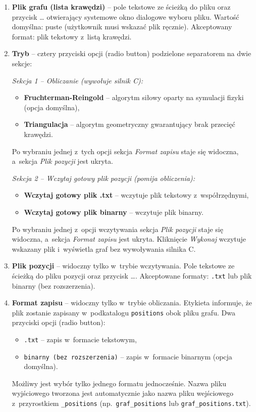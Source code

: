 \documentclass[12pt,a4paper]{article}
\begin{document}
\begin{enumerate}
    \item \textbf{Plik grafu (lista krawędzi)} -- pole tekstowe ze ścieżką do pliku oraz przycisk \ldots{} otwierający systemowe okno dialogowe wyboru pliku. Wartość domyślna: puste (użytkownik musi wskazać plik ręcznie). Akceptowany format: plik tekstowy z~listą krawędzi.

    \item \textbf{Tryb} -- cztery przyciski opcji (radio button) podzielone separatorem na dwie sekcje:
    
    \textit{Sekcja 1 -- Obliczanie (wywołuje silnik C):}
    \begin{itemize}
        \item \textbf{Fruchterman-Reingold} -- algorytm siłowy oparty na symulacji fizyki (opcja domyślna),
        \item \textbf{Triangulacja} -- algorytm geometryczny gwarantujący brak przecięć krawędzi.
    \end{itemize}
    Po wybraniu jednej z~tych opcji sekcja \textit{Format zapisu} staje się widoczna, a~sekcja \textit{Plik pozycji} jest ukryta.

    \textit{Sekcja 2 -- Wczytaj gotowy plik pozycji (pomija obliczenia):}
    \begin{itemize}
        \item \textbf{Wczytaj gotowy plik .txt} -- wczytuje plik tekstowy z~współrzędnymi,
        \item \textbf{Wczytaj gotowy plik binarny} -- wczytuje plik binarny.
    \end{itemize}
    Po wybraniu jednej z~opcji wczytywania sekcja \textit{Plik pozycji} staje się widoczna, a~sekcja \textit{Format zapisu} jest ukryta. Kliknięcie \textit{Wykonaj} wczytuje wskazany plik i~wyświetla graf bez wywoływania silnika C.

    \item \textbf{Plik pozycji} -- widoczny tylko w~trybie wczytywania. Pole tekstowe ze ścieżką do pliku pozycji oraz przycisk \ldots. Akceptowane formaty: \texttt{.txt} lub plik binarny (bez rozszerzenia).

    \item \textbf{Format zapisu} -- widoczny tylko w~trybie obliczania. Etykieta informuje, że plik zostanie zapisany w~podkatalogu \texttt{positions} obok pliku grafu. Dwa przyciski opcji (radio button):
    \begin{itemize}
        \item \texttt{.txt} -- zapis w~formacie tekstowym,
        \item \texttt{binarny (bez rozszerzenia)} -- zapis w~formacie binarnym (opcja domyślna).
    \end{itemize}
    Możliwy jest wybór tylko jednego formatu jednocześnie. Nazwa pliku wyjściowego tworzona jest automatycznie jako nazwa pliku wejściowego z~przyrostkiem \texttt{\_positions} (np.~\texttt{graf\_positions} lub \texttt{graf\_positions.txt}).


\end{enumerate}
\end{document}
